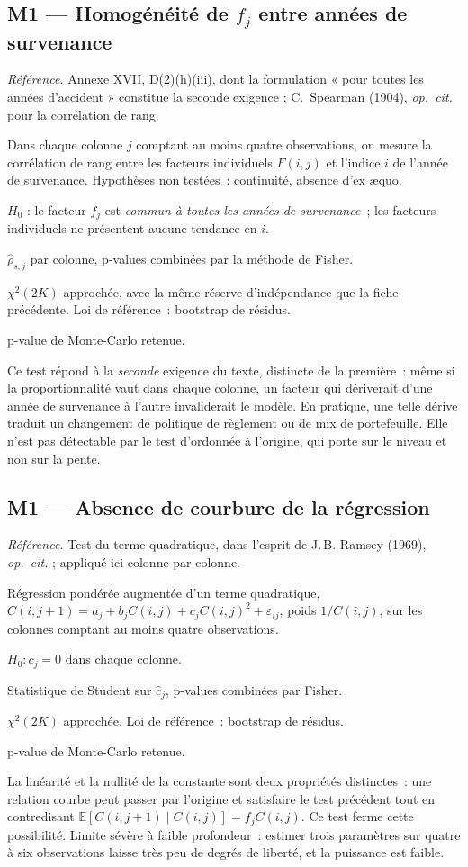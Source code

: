 \documentclass[a4paper,11pt]{article}
\newcommand{\refl}[1]{{\small\textcolor{maincolor!70!black}{\textit{Référence.} #1}}\par\smallskip}
\newcounter{ficheid}
\newenvironment{fiche}[1]{%
  \stepcounter{ficheid}%
  \phantomsection
  \subsection{#1}%
  \label{fiche:\theficheid}%
}{%
  \end{description}\vspace{0.5em}%
}
\newcommand{\Cadre}{%
  \begin{description}[leftmargin=0pt, style=unboxed, itemsep=3pt, topsep=3pt, parsep=2pt]%
  \item[\textcolor{financeblue}{\textbf{1. Cadre, notations et hypothèses de validité (non testées).}}]}
\newcommand{\Hzero}{\item[\textcolor{financeblue}{\textbf{2. Hypothèse nulle.}}]}
\newcommand{\Stat}{\item[\textcolor{financeblue}{\textbf{3. Statistique de test.}}]}
\newcommand{\Loi}{\item[\textcolor{financeblue}{\textbf{4. Loi sous $H_0$.}}]}
\newcommand{\Pval}{\item[\textcolor{financeblue}{\textbf{5. p-value.}}]}
\newcommand{\Usage}{\item[\textcolor{financeblue}{\textbf{6. Usage et limites.}}]}
\begin{document}
\begin{fiche}{M1 --- Homogénéité de $f_j$ entre années de survenance}
\label{mw:m1b}
\refl{Annexe XVII, D(2)(h)(iii), dont la formulation « pour toutes les années
d'accident » constitue la seconde exigence ; C.~Spearman (1904),
\emph{op.\ cit.} pour la corrélation de rang.}
\Cadre
Dans chaque colonne $j$ comptant au moins quatre observations, on mesure la
corrélation de rang entre les facteurs individuels $F(i,j)$ et l'indice $i$ de
l'année de survenance. Hypothèses non testées~: continuité, absence d'ex
\ae quo.
\Hzero
$H_0$ : le facteur $f_j$ est \emph{commun à toutes les années de survenance}~;
les facteurs individuels ne présentent aucune tendance en $i$.
\Stat
$\hat\rho_{s,j}$ par colonne, p-values combinées par la méthode de Fisher.
\Loi
$\chi^2(2K)$ approchée, avec la même réserve d'indépendance que la fiche
précédente. Loi de référence~: bootstrap de résidus.
\Pval
p-value de Monte-Carlo retenue.
\Usage
Ce test répond à la \emph{seconde} exigence du texte, distincte de la première~:
même si la proportionnalité vaut dans chaque colonne, un facteur qui dériverait
d'une année de survenance à l'autre invaliderait le modèle. En pratique, une
telle dérive traduit un changement de politique de règlement ou de mix de
portefeuille. Elle n'est pas détectable par le test d'ordonnée à l'origine, qui
porte sur le niveau et non sur la pente.
\end{fiche}

\begin{fiche}{M1 --- Absence de courbure de la régression}
\label{mw:m1c}
\refl{Test du terme quadratique, dans l'esprit de J.\,B. Ramsey (1969),
\emph{op.\ cit.} ; appliqué ici colonne par colonne.}
\Cadre
Régression pondérée augmentée d'un terme quadratique,
$C(i,j+1) = a_j + b_j C(i,j) + c_j C(i,j)^2 + \varepsilon_{ij}$, poids
$1/C(i,j)$, sur les colonnes comptant au moins quatre observations.
\Hzero
$H_0 : c_j = 0$ dans chaque colonne.
\Stat
Statistique de Student sur $\hat c_j$, p-values combinées par Fisher.
\Loi
$\chi^2(2K)$ approchée. Loi de référence~: bootstrap de résidus.
\Pval
p-value de Monte-Carlo retenue.
\Usage
La linéarité et la nullité de la constante sont deux propriétés distinctes~: une
relation courbe peut passer par l'origine et satisfaire le test précédent tout en
contredisant $\mathbb{E}[C(i,j+1)\mid C(i,j)] = f_j C(i,j)$. Ce test ferme cette
possibilité. Limite sévère à faible profondeur~: estimer trois paramètres sur
quatre à six observations laisse très peu de degrés de liberté, et la puissance
est faible.
\end{fiche}
\end{document}
